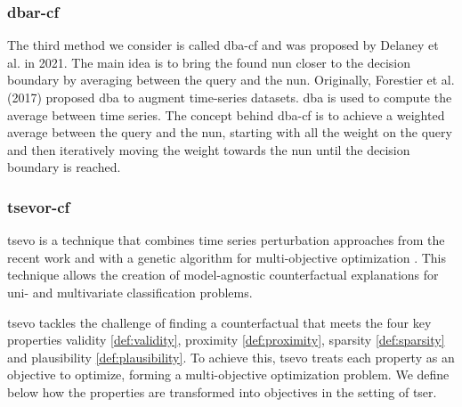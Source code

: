 \subsubsection{\gls{dbar}-\gls{cf}}
\label{sec:methods:dbar}
The third method we consider is called \gls{dba}-\gls{cf} and was proposed by Delaney et al. \cite{delaney_instance-based_2021} in 2021. The main idea is to bring the found \gls{nun} closer to the decision boundary by averaging between the query and the \gls{nun}. Originally, Forestier et al. \cite{forestier_generating_2017} (2017) proposed \gls{dba} to augment time-series datasets. \gls{dba} is used to compute the average between time series. The concept behind \gls{dba}-\gls{cf} is to achieve a weighted average between the query and the \gls{nun}, starting with all the weight on the query and then iteratively moving the weight towards the \gls{nun} until the decision boundary is reached.
\subsubsection{\gls{tsevor}-\gls{cf}}
\label{sec:methods:tsevo}
\gls{tsevo} is a technique that combines time series perturbation approaches from the recent work\cite{guilleme_agnostic_2019} and \cite{mujkanovic_timexplain_2023} with a genetic algorithm for multi-objective optimization \cite{dandl_multi-objective_2020}. This technique allows the creation of model-agnostic counterfactual explanations for uni- and multivariate classification problems.

\gls{tsevo} tackles the challenge of finding a counterfactual that meets the four key properties validity \ref{def:validity}, proximity \ref{def:proximity}, sparsity \ref{def:sparsity} and plausibility \ref{def:plausibility}. To achieve this, \gls{tsevo} treats each property as an objective to optimize, forming a multi-objective optimization problem. We define below how the properties are transformed into objectives in the setting of \gls{tser}. 

